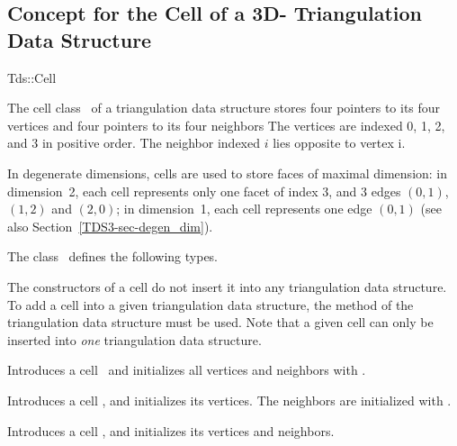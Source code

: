 	\subsection{Concept for the Cell of a 3D- Triangulation Data Structure} 
	\label{TDS3-sec-concept-Tds_Cell}

	\begin{ccClass}{Tds::Cell}


The cell class \ccClassName\ of a triangulation data structure stores
four pointers to its four vertices and four pointers to its four
neighbors The vertices are indexed 0, 1, 2, and 3 in positive order.
The neighbor indexed $i$ lies opposite to vertex i.

In degenerate dimensions, cells are used to store faces of maximal
dimension: in dimension~2, each cell represents only one
facet of index 3, and 3 edges $(0,1)$, $(1,2)$ and $(2,0)$; in
dimension~1, each cell represents one edge $(0,1)$ (see also
Section~\ref{TDS3-sec-degen_dim}). 

\ccTypes
{}
\ccThreeToTwo
The class \ccClassName\ defines the following types.

\ccGlue
{}

\ccCreation
{}

The constructors of a cell do not insert it into any triangulation
data structure. To add a cell into a given triangulation
data structure, the  method of the triangulation
data structure must be used. Note that a given cell can only be
inserted into \textit{one} triangulation data structure.

{Introduces a cell \ccVar\ and initializes all vertices and neighbors 
 with .}


{Introduces a cell \ccVar, and initializes its vertices. The neighbors
are initialized with .} 

{Introduces a cell \ccVar, and initializes its vertices and neighbors.}


\end{ccClass}
